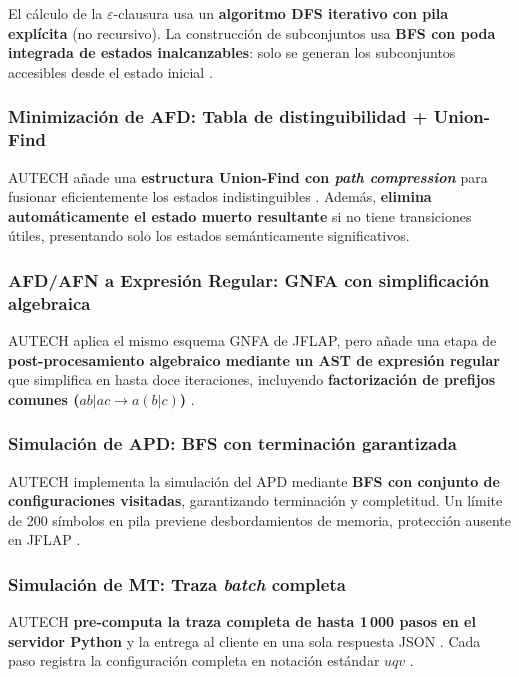 El cálculo de la $\varepsilon$-clausura usa un \textbf{algoritmo DFS iterativo con pila explícita}
(no recursivo). La construcción de subconjuntos usa \textbf{BFS con poda integrada de estados
inalcanzables}: solo se generan los subconjuntos accesibles desde el estado inicial
\cite{hopcroft2007}.

\subsubsection*{Minimización de AFD: Tabla de distinguibilidad + Union-Find}

AUTECH añade una \textbf{estructura Union-Find con \textit{path compression}} para fusionar
eficientemente los estados indistinguibles \cite{hopcroft2007}. Además, \textbf{elimina
automáticamente el estado muerto resultante} si no tiene transiciones útiles,
presentando solo los estados semánticamente significativos.

\subsubsection*{AFD/AFN a Expresión Regular: GNFA con simplificación algebraica}

AUTECH aplica el mismo esquema GNFA de JFLAP, pero añade una etapa de
\textbf{post-procesamiento algebraico mediante un AST de expresión regular} que simplifica en hasta
doce iteraciones, incluyendo \textbf{factorización de prefijos comunes
($ab|ac \rightarrow a(b|c)$)} \cite{aho2006}.

\subsubsection*{Simulación de APD: BFS con terminación garantizada}

AUTECH implementa la simulación del APD mediante \textbf{BFS con conjunto de configuraciones
visitadas}, garantizando terminación y completitud. Un límite de 200 símbolos en pila previene
desbordamientos de memoria, protección ausente en JFLAP \cite{rodger2006}\cite{hopcroft2007}.

\subsubsection*{Simulación de MT: Traza \textit{batch} completa}

AUTECH \textbf{pre-computa la traza completa de hasta 1\,000 pasos en el servidor Python} y la
entrega al cliente en una sola respuesta JSON \cite{fielding2000}. Cada paso registra la
configuración completa en notación estándar $uqv$ \cite{sipser2012}.

